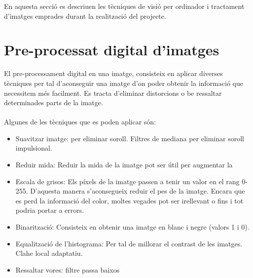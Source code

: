 En aquesta secció es descriuen les tècniques de visió per ordinador i tractament d'imatges emprades durant la realització del projecte.

\section{Pre-processat digital d'imatges}
	El pre-processament digital en una imatge, consisteix en aplicar diverses tècniques per tal d'aconseguir una imatge d'on poder obtenir la informació que necessitem més facilment. Es tracta
	d'eliminar distorcions o be ressaltar determinades parts de la imatge.\\\\
	Algunes de les tècniques que es poden aplicar són:

	\begin{itemize}	
		\item{Suavitzar imatge: per eliminar soroll. Filtres de mediana per eliminar soroll impulsional.}
		\item{Reduir mida: Reduir la mida de la imatge pot ser útil per augmentar la}
		\item{Escala de grisos: Els píxels de la imatge passen a tenir un valor en el rang 0-255. D'aquesta manera s'aconsegueix reduir el pes de la imatge. Encara que es perd la informació del color, moltes
		vegades pot ser irellevant o fins i tot podria portar a errors.}
		\item{Binarització: Consisteix en obtenir una imatge en blanc i negre (valors 1 i 0).}
		\item{Equalització de l'histograma: Per tal de millorar el contrast de les imatges. Clahe local adaptatiu.}
		\item{Ressaltar vores: filtre passa baixos}
	\end{itemize}
	

\newpage
